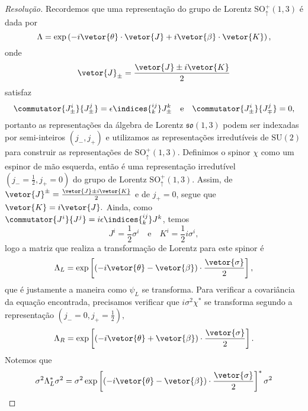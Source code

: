 \begin{proof}[Resolução]
    Recordemos que uma representação do grupo de Lorentz \(\mathrm{SO}_{\uparrow}^+(1,3)\) é dada por
    \begin{equation*}
        \Lambda = \exp\left(- i \vetor{\theta}\cdot \vetor{J} + i \vetor{\beta}\cdot\vetor{K}\right),
    \end{equation*}
    onde 
    \begin{equation*}
        \vetor{J}_\pm = \frac{\vetor{J} \pm i \vetor{K}}{2}
    \end{equation*}
    satisfaz
    \begin{equation*}
        \commutator{J_\pm^i}{J_\pm^j} = \epsilon\indices{^{ij}_k} J_\pm^k
        \quad\text{e}\quad
        \commutator{J_\pm^i}{J_\mp^j} = 0,
    \end{equation*}
    portanto as representações da álgebra de Lorentz \(\mathfrak{so}(1,3)\) podem ser indexadas por semi-inteiros \((j_-, j_+)\) e utilizamos as representações irredutíveis de \(\mathrm{SU}(2)\) para construir as representações de \(\mathrm{SO}_\uparrow^+(1,3).\) Definimos o spinor \(\chi\) como um espinor de mão esquerda, então é uma representação irredutível 
    \((j_-=\frac12,j_+= 0)\) do grupo de Lorentz \(\mathrm{SO}_{\uparrow}^+(1,3).\)
    Assim, de 
    \(\vetor{J}^{\pm} = \frac{\vetor{J} \pm i \vetor{K}}{2}\)
    e de \(j_+ = 0\), segue que \(\vetor{K} = i \vetor{J}.\) Ainda, como 
    \(\commutator{J^i}{J^j} = i\epsilon\indices{^{ij}_k} J^k\),
    temos
    \begin{equation*}
        J^i = \frac12 \sigma^i\quad\text{e}\quad
        K^i = \frac12 i \sigma^i,
    \end{equation*}
    logo a matriz que realiza a transformação de Lorentz para este spinor é
    \begin{equation*}
        \Lambda_L = \exp\left[(-i \vetor{\theta} - \vetor{\beta}) \cdot \frac{\vetor{\sigma}}{2}\right],
    \end{equation*}
    que é justamente a maneira como \(\psi_L\) se transforma. Para verificar a covariância da equação encontrada, precisamos verificar que \(i \sigma^2 \chi^*\) se transforma segundo a representação \((j_- = 0, j_+ = \frac12),\)
    \begin{equation*}
        \Lambda_R = \exp\left[(-i \vetor{\theta} + \vetor{\beta}) \cdot \frac{\vetor{\sigma}}{2}\right].
    \end{equation*}
    Notemos que
    \begin{align*}
        \sigma^2 \Lambda_L^* \sigma^2 &= \sigma^2 \exp\left[(-i \vetor{\theta} - \vetor{\beta}) \cdot \frac{\vetor{\sigma}}{2}\right]^* \sigma^2\\

\end{align*}
\end{proof}

